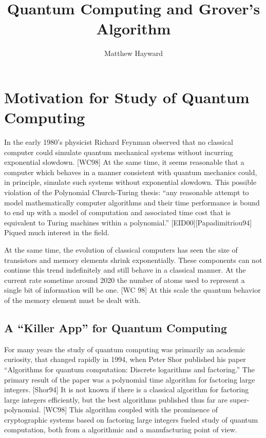 \documentclass[]{article}
\begin{document}
\title{Quantum Computing and Grover's Algorithm}
\author{Matthew Hayward}
\maketitle
\pagebreak

\tableofcontents

\pagebreak

\section{Motivation for Study of Quantum Computing}

In the early 1980's physicist Richard Feynman observed that no
classical computer could simulate quantum mechanical systems without
incurring exponential slowdown.  [WC98] At the same time, it seems
reasonable that a computer which behaves in a manner consistent with
quantum mechanics could, in principle, simulate such systems without
exponential slowdown.  This possible violation of the Polynomial
Church-Turing thesis: ``any reasonable attempt to model mathematically
computer algorithms and their time performance is bound to end up with
a model of computation and associated time cost that is equivalent to
Turing machines within a polynomial.''  [EID00][Papadimitriou94]
Piqued much interest in the field.
	
At the same time, the evolution of classical computers has seen the
size of transistors and memory elements shrink exponentially.  These
components can not continue this trend indefinitely and still behave
in a classical manner.  At the current rate sometime around 2020 the
number of atoms used to represent a single bit of information will be
one.  [WC 98] At this scale the quantum behavior of the memory element
must be dealt with.

\subsection{A ``Killer App'' for Quantum Computing}

For many years the study of quantum computing was primarily an
academic curiosity, that changed rapidly in 1994, when Peter Shor
published his paper ``Algorithms for quantum computation: Discrete
logarithms and factoring.''  The primary result of the paper was a
polynomial time algorithm for factoring large integers.  [Shor94] It
is not known if there is a classical algorithm for factoring large
integers efficiently, but the best algorithms published thus far are
super-polynomial. [WC98] This algorithm coupled with the prominence of
cryptographic systems based on factoring large integers fueled study
of quantum computation, both from a algorithmic and a manufacturing
point of view.
\end{document}
